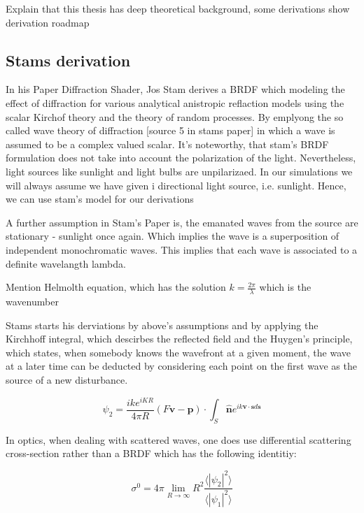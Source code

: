 Explain that this thesis has deep theoretical background, some derivations
show derivation roadmap


\subsection{Stams derivation}

In his Paper Diffraction Shader, Jos Stam derives a BRDF which modeling the effect of diffraction for various analytical anistropic reflaction models using the scalar Kirchof theory and the theory of random processes. By emplyong the so called wave theory of diffraction [source 5 in stams paper] in which a wave is assumed to be a complex valued scalar. It's noteworthy, that stam's BRDF formulation does not take into account the polarization of the light. Nevertheless, light sources like sunlight and light bulbs are unpilarizaed. In our simulations we will always assume we have given i directional light source, i.e. sunlight. Hence, we can use stam's model for our derivations

A further assumption in Stam's Paper is, the emanated waves from the source are stationary - sunlight once again.
Which implies the wave is a superposition of independent monochromatic waves. This implies that each wave is associated to a definite wavelangth lambda.

Mention Helmolth equation, which has the solution $k = \frac{2\pi}{\lambda}$ which is the wavenumber

Stams starts his derviations by above's assumptions and by applying the Kirchhoff integral, which descirbes the reflected field and the Huygen's principle, which states, when somebody knows the wavefront at a given moment, the wave at a later time can be deducted by considering each point on the first wave as the source of a new disturbance.

\begin{equation}
  \psi_2 = \frac{i k e^{i K R}}{4 \pi R}(F\mathbf{v}-\mathbf{p}) \cdot \int_{S} \hat{\mathbf{n}} e^{ik\mathbf{v} \cdot \mathbf{s} d\mathbf{s}}
\end{equation}


In optics, when dealing with scattered waves, one does use differential scattering cross-section rather than a BRDF which has the following identitiy: 

\begin{equation}
    \sigma^0 = 4 \pi \lim_{R \to \infty} R^2 \frac{\langle \left|\psi_2\right|^2\rangle}{\langle \left|\psi_1\right|^2\rangle}
\end{equation}

